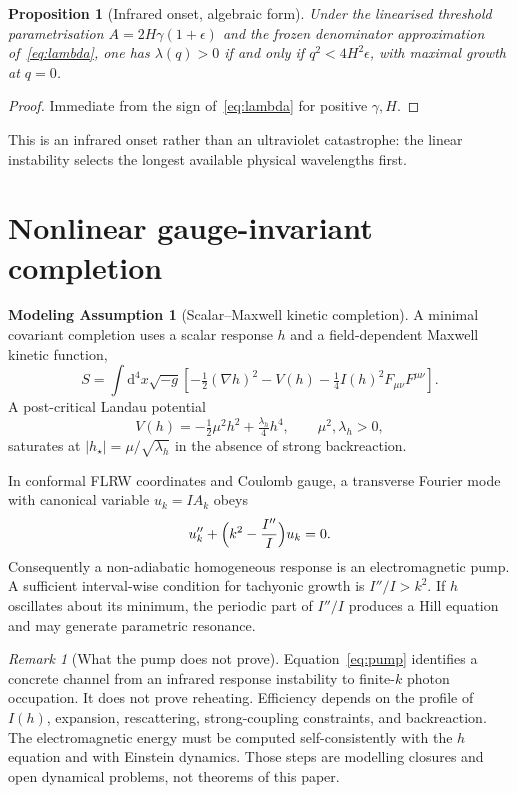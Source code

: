 \documentclass[11pt]{article}
\newtheorem{proposition}[theorem]{Proposition}
\theoremstyle{definition}
\newtheorem{model}[theorem]{Modeling Assumption}
\theoremstyle{remark}
\newtheorem{remark}[theorem]{Remark}
\newcommand{\dd}{\mathrm{d}}
\begin{document}
\begin{proposition}[Infrared onset, algebraic form]
\label{prop:onset}
Under the linearised threshold parametrisation $A=2H\gamma(1+\epsilon)$ and the frozen
denominator approximation of~\eqref{eq:lambda}, one has $\lambda(q)>0$ if and only if
$q^2<4H^2\epsilon$, with maximal growth at $q=0$.
\end{proposition}

\begin{proof}
Immediate from the sign of~\eqref{eq:lambda} for positive $\gamma,H$.
\end{proof}

This is an infrared onset rather than an ultraviolet catastrophe: the linear instability
selects the longest available physical wavelengths first.

\section{Nonlinear gauge-invariant completion}
\label{sec:nonlinear}
\begin{model}[Scalar--Maxwell kinetic completion]
\label{mod:I}
A minimal covariant completion uses a scalar response $h$ and a field-dependent Maxwell
kinetic function,
\begin{equation}
\label{eq:action}
S=\int\dd^4x\sqrt{-g}\left[
-\tfrac12(\nabla h)^2-V(h)-\tfrac14 I(h)^2F_{\mu\nu}F^{\mu\nu}
\right].
\end{equation}
A post-critical Landau potential
\begin{equation}
V(h)=-\tfrac12\mu^2 h^2+\tfrac{\lambda_h}{4}h^4,
\qquad\mu^2,\lambda_h>0,
\end{equation}
saturates at $|h_\star|=\mu/\sqrt{\lambda_h}$ in the absence of strong backreaction.
\end{model}

In conformal FLRW coordinates and Coulomb gauge, a transverse Fourier mode with canonical
variable $u_k=I A_k$ obeys
\begin{equation}
\label{eq:pump}
u_k''+\Bigl(k^2-\frac{I''}{I}\Bigr)u_k=0.
\end{equation}
Consequently a non-adiabatic homogeneous response is an electromagnetic pump.
A sufficient interval-wise condition for tachyonic growth is $I''/I>k^2$.
If $h$ oscillates about its minimum, the periodic part of $I''/I$ produces a Hill equation and
may generate parametric resonance.

\begin{remark}[What the pump does not prove]
\label{rem:pump}
Equation~\eqref{eq:pump} identifies a concrete channel from an infrared response instability to
finite-$k$ photon occupation.
It does not prove reheating.
Efficiency depends on the profile of $I(h)$, expansion, rescattering, strong-coupling
constraints, and backreaction.
The electromagnetic energy must be computed self-consistently with the $h$ equation and with
Einstein dynamics.
Those steps are modelling closures and open dynamical problems, not theorems of this paper.
\end{remark}
\end{document}
